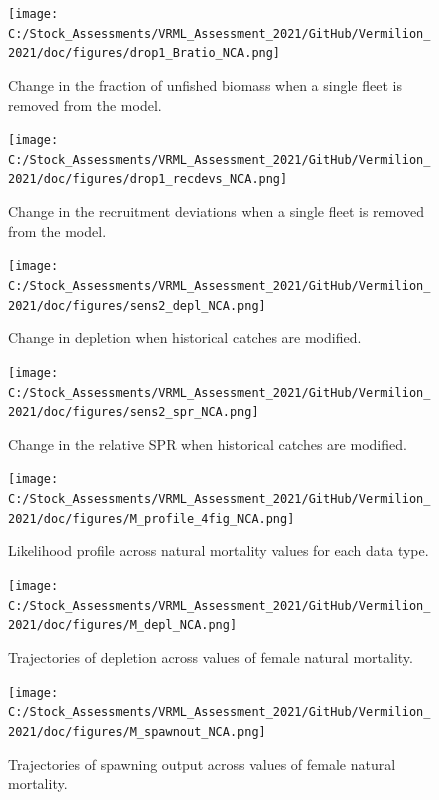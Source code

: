 \documentclass[
  english,
  a4paper,
]{article}
\begin{document}
\begin{figure}
\centering
\texttt{[image: C:/Stock\_Assessments/VRML\_Assessment\_2021/GitHub/Vermilion\_2021/doc/figures/drop1\_Bratio\_NCA.png]}
\caption{Change in the fraction of unfished biomass when a single fleet is removed from the model.\label{fig:drop-bratio}}
\end{figure}

\begin{figure}
\centering
\texttt{[image: C:/Stock\_Assessments/VRML\_Assessment\_2021/GitHub/Vermilion\_2021/doc/figures/drop1\_recdevs\_NCA.png]}
\caption{Change in the recruitment deviations when a single fleet is removed from the model.\label{fig:drop-recdev}}
\end{figure}

\begin{figure}
\centering
\texttt{[image: C:/Stock\_Assessments/VRML\_Assessment\_2021/GitHub/Vermilion\_2021/doc/figures/sens2\_depl\_NCA.png]}
\caption{Change in depletion when historical catches are modified.\label{fig:sens2-depl}}
\end{figure}

\begin{figure}
\centering
\texttt{[image: C:/Stock\_Assessments/VRML\_Assessment\_2021/GitHub/Vermilion\_2021/doc/figures/sens2\_spr\_NCA.png]}
\caption{Change in the relative SPR when historical catches are modified.\label{fig:sens2-spr}}
\end{figure}

\begin{figure}
\centering
\texttt{[image: C:/Stock\_Assessments/VRML\_Assessment\_2021/GitHub/Vermilion\_2021/doc/figures/M\_profile\_4fig\_NCA.png]}
\caption{Likelihood profile across natural mortality values for each data type.\label{fig:m-profile}}
\end{figure}

\begin{figure}
\centering
\texttt{[image: C:/Stock\_Assessments/VRML\_Assessment\_2021/GitHub/Vermilion\_2021/doc/figures/M\_depl\_NCA.png]}
\caption{Trajectories of depletion across values of female natural mortality.\label{fig:m-depl}}
\end{figure}

\begin{figure}
\centering
\texttt{[image: C:/Stock\_Assessments/VRML\_Assessment\_2021/GitHub/Vermilion\_2021/doc/figures/M\_spawnout\_NCA.png]}
\caption{Trajectories of spawning output across values of female natural mortality.\label{fig:m-spawn}}
\end{figure}
\end{document}
